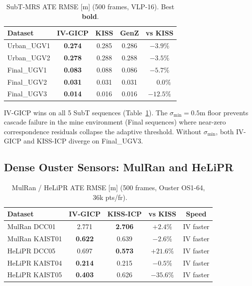 \documentclass[letterpaper, 10pt, conference]{ieeeconf}
\newcommand{\best}[1]{\textbf{#1}}
\begin{document}
\begin{table}[t]
\centering
\caption{SubT-MRS ATE RMSE [m] (500 frames, VLP-16). Best \textbf{bold}.}
\label{tab:subt}
\begin{tabular}{lcccc}
\toprule
Dataset & IV-GICP & KISS & GenZ & vs KISS \\
\midrule
Urban\_UGV1 & \best{0.274} & 0.285 & 0.286 & $-3.9\%$ \\
Urban\_UGV2 & \best{0.278} & 0.288 & 0.288 & $-3.5\%$ \\
Final\_UGV1 & \best{0.083} & 0.088 & 0.086 & $-5.7\%$ \\
Final\_UGV2 & \best{0.031} & 0.031 & 0.031 & $\phantom{+}0.0\%$ \\
Final\_UGV3 & \best{0.014} & 0.016 & 0.016 & $-12.5\%$ \\
\bottomrule
\end{tabular}
\end{table}

IV-GICP wins on all 5 SubT sequences (Table~\ref{tab:subt}).
The $\sigma_{\min}{=}0.5$m floor prevents cascade failure in the mine environment
(Final sequences) where near-zero correspondence residuals collapse the adaptive
threshold.
Without $\sigma_{\min}$, both IV-GICP and KISS-ICP diverge on Final\_UGV3.

\subsection{Dense Ouster Sensors: MulRan and HeLiPR}\label{sec:ouster}

\begin{table}[t]
\centering
\caption{MulRan / HeLiPR ATE RMSE [m] (500 frames, Ouster OS1-64, ~36k pts/fr).}
\label{tab:ouster}
\begin{tabular}{lcccc}
\toprule
Dataset & IV-GICP & KISS-ICP & vs KISS & Speed \\
\midrule
MulRan DCC01 & 2.771 & \best{2.706} & $+2.4\%$ & IV faster \\
MulRan KAIST01 & \best{0.622} & 0.639 & $-2.6\%$ & IV faster \\
HeLiPR DCC05 & 0.697 & \best{0.573} & $+21.6\%$ & IV faster \\
HeLiPR KAIST04 & \best{0.214} & 0.215 & $-0.5\%$ & IV faster \\
HeLiPR KAIST05 & \best{0.403} & 0.626 & $-35.6\%$ & IV faster \\
\bottomrule
\end{tabular}
\end{table}
\end{document}
